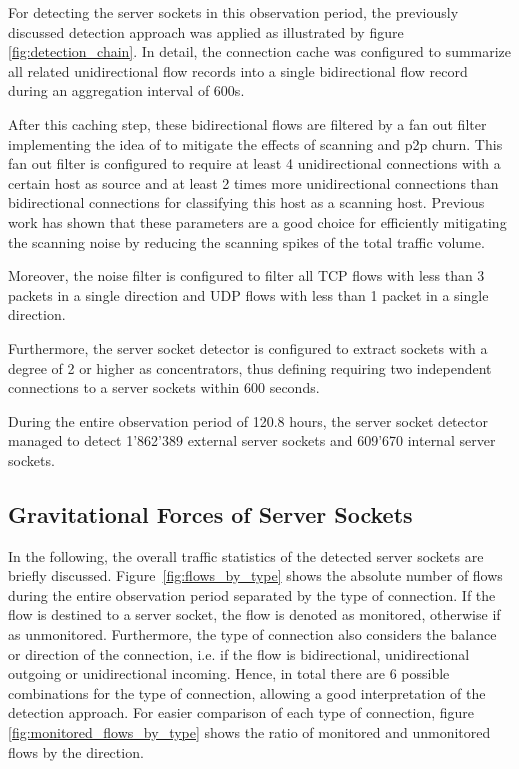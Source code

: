 For detecting the server sockets in this observation period, the previously 
discussed detection approach was applied as illustrated by figure 
\ref{fig:detection_chain}. In detail, the connection cache was configured to 
summarize all related unidirectional flow records into a single bidirectional 
flow record during an aggregation interval of 600s. 

After this caching step, these bidirectional flows are filtered by a fan out 
filter implementing the idea of \citet{Allman:2007} to mitigate the effects of 
scanning and \gls{p2p} churn. This fan out filter is configured to require at least 4 
unidirectional connections with a certain host as source and at least 2 times 
more unidirectional connections than bidirectional connections for classifying 
this host as a scanning host. Previous 
work\citep{Schatzmann:Mining,Schatzmann:Dissection, Schatzmann:Tracing} has 
shown that these parameters are a good choice for efficiently mitigating the 
scanning noise by reducing the scanning spikes of the total traffic volume. 

Moreover, the noise filter is configured to filter all \gls{TCP} flows with less than 
3 packets in a single direction and \gls{UDP} flows with less than 1 packet in a 
single direction. 

Furthermore, the server socket detector is configured to extract sockets with a 
degree of 2 or higher as concentrators, thus defining requiring two independent 
connections to a server sockets within 600 seconds. 

During the entire observation period of 120.8 hours, the server socket detector 
managed to detect 1'862'389 external server sockets and 609'670 internal server 
sockets.

\subsection{Gravitational Forces of Server Sockets}
In the following, the overall traffic statistics of the detected server sockets 
are briefly discussed. Figure \ref{fig:flows_by_type} shows the absolute number 
of flows during the entire observation period separated by the type of 
connection. If the flow is destined to a server socket, the flow is denoted as 
monitored, otherwise if as unmonitored. Furthermore, the type of connection also 
considers the balance or direction of the connection, i.e. if the flow is 
bidirectional, unidirectional outgoing or unidirectional incoming. Hence, in 
total there are 6 possible combinations for the type of connection, allowing a 
good interpretation of the detection approach. For easier comparison of each 
type of connection, figure \ref{fig:monitored_flows_by_type} shows the ratio of 
monitored and unmonitored flows by the direction.

